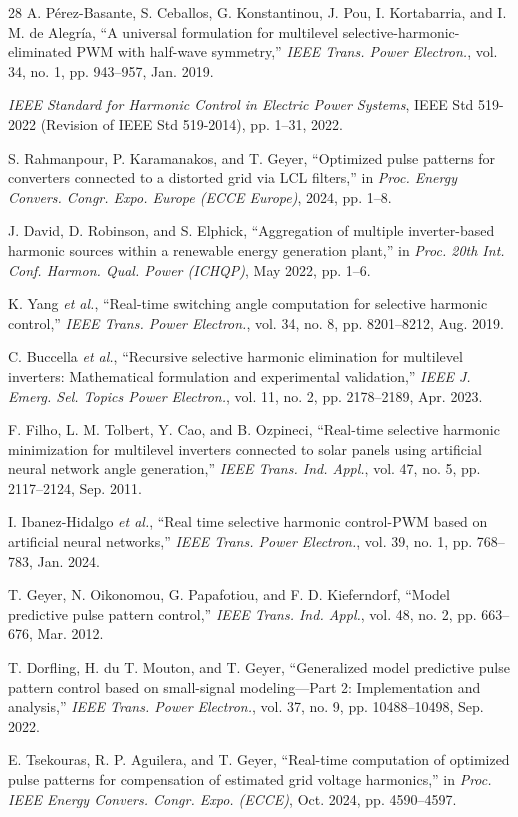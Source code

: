 \documentclass[conference]{IEEEtran}
\begin{document}
\begin{thebibliography}{28}
A. P\'{e}rez-Basante, S. Ceballos, G. Konstantinou, J. Pou, I. Kortabarria,
and I. M. de Alegr\'{i}a, ``A universal formulation for multilevel
selective-harmonic-eliminated PWM with half-wave symmetry,'' \emph{IEEE Trans.
Power Electron.}, vol. 34, no. 1, pp. 943--957, Jan. 2019.

\emph{IEEE Standard for Harmonic Control in Electric Power Systems}, IEEE Std
519-2022 (Revision of IEEE Std 519-2014), pp. 1--31, 2022.

S. Rahmanpour, P. Karamanakos, and T. Geyer, ``Optimized pulse patterns for
converters connected to a distorted grid via LCL filters,'' in \emph{Proc.
Energy Convers. Congr. Expo. Europe (ECCE Europe)}, 2024, pp. 1--8.

J. David, D. Robinson, and S. Elphick, ``Aggregation of multiple inverter-based
harmonic sources within a renewable energy generation plant,'' in \emph{Proc.
20th Int. Conf. Harmon. Qual. Power (ICHQP)}, May 2022, pp. 1--6.

K. Yang \emph{et al.}, ``Real-time switching angle computation for selective
harmonic control,'' \emph{IEEE Trans. Power Electron.}, vol. 34, no. 8,
pp. 8201--8212, Aug. 2019.

C. Buccella \emph{et al.}, ``Recursive selective harmonic elimination for
multilevel inverters: Mathematical formulation and experimental validation,''
\emph{IEEE J. Emerg. Sel. Topics Power Electron.}, vol. 11, no. 2,
pp. 2178--2189, Apr. 2023.

F. Filho, L. M. Tolbert, Y. Cao, and B. Ozpineci, ``Real-time selective harmonic
minimization for multilevel inverters connected to solar panels using artificial
neural network angle generation,'' \emph{IEEE Trans. Ind. Appl.}, vol. 47, no. 5,
pp. 2117--2124, Sep. 2011.

I. Ibanez-Hidalgo \emph{et al.}, ``Real time selective harmonic control-PWM based
on artificial neural networks,'' \emph{IEEE Trans. Power Electron.}, vol. 39, no.
1, pp. 768--783, Jan. 2024.

T. Geyer, N. Oikonomou, G. Papafotiou, and F. D. Kieferndorf, ``Model
predictive pulse pattern control,'' \emph{IEEE Trans. Ind. Appl.}, vol. 48,
no. 2, pp. 663--676, Mar. 2012.

T. Dorfling, H. du T. Mouton, and T. Geyer, ``Generalized model predictive
pulse pattern control based on small-signal modeling---Part 2: Implementation
and analysis,'' \emph{IEEE Trans. Power Electron.}, vol. 37, no. 9,
pp. 10488--10498, Sep. 2022.

E. Tsekouras, R. P. Aguilera, and T. Geyer, ``Real-time computation of
optimized pulse patterns for compensation of estimated grid voltage
harmonics,'' in \emph{Proc. IEEE Energy Convers. Congr. Expo. (ECCE)}, Oct.
2024, pp. 4590--4597.

\end{thebibliography}
\end{document}
